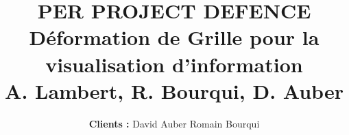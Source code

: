 
\def\presentation{PER PROJECT DEFENCE}
\def\bottomTitle{PER PROJECT}
\def\noteAboutAuthor{Engeneering students/ENSEIRB-MATMECA}
\def\subject{Grid deformation for data visualization}
\def\subject{Déformation de Grille pour la visualisation d'information}
\title[\bottomTitle]{
        {\bfseries \huge \presentation\\} 
        {\bfseries \subject}\\
        {\small\bf A. Lambert, R. Bourqui, D. Auber}\\   
}


\author[\noteAboutAuthor]{
  {\normalsize \bfseries \sffamily Clients : }
  David {\sc Auber} \hspace{1cm} Romain {\sc Bourqui}\\    
}

